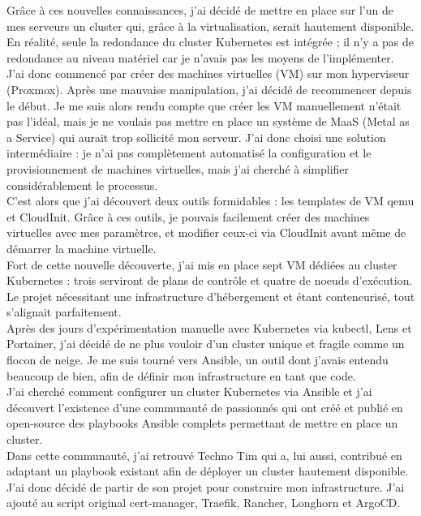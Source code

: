 Grâce à ces nouvelles connaissances, j'ai décidé de mettre en place sur l'un de mes serveurs un cluster qui,
grâce à la virtualisation, serait hautement disponible.
En réalité, seule la redondance du cluster Kubernetes est intégrée ;
il n'y a pas de redondance au niveau matériel car je n'avais pas les moyens de l'implémenter.\\

J'ai donc commencé par créer des machines virtuelles (VM) sur mon hyperviseur (Proxmox).
Après une mauvaise manipulation, j'ai décidé de recommencer depuis le début.
Je me suis alors rendu compte que créer les VM manuellement n'était pas l'idéal,
mais je ne voulais pas mettre en place un système de MaaS (Metal as a Service) qui aurait trop sollicité mon serveur.
J'ai donc choisi une solution intermédiaire : je n'ai pas complètement automatisé la configuration et le provisionnement
de machines virtuelles, mais j'ai cherché à simplifier considérablement le processus.\\

C'est alors que j'ai découvert deux outils formidables : les templates de VM qemu et CloudInit.
Grâce à ces outils, je pouvais facilement créer des machines virtuelles avec mes paramètres,
et modifier ceux-ci via CloudInit avant même de démarrer la machine virtuelle.\\

Fort de cette nouvelle découverte, j'ai mis en place sept VM dédiées au cluster Kubernetes :
trois serviront de plans de contrôle et quatre de noeuds d'exécution.\\

Le projet nécessitant une infrastructure d'hébergement et étant conteneurisé, tout s'alignait parfaitement.\\

Après des jours d'expérimentation manuelle avec Kubernetes via kubectl, Lens et Portainer, j'ai décidé de ne plus vouloir
d'un cluster unique et fragile comme un flocon de neige.
Je me suis tourné vers Ansible, un outil dont j'avais entendu beaucoup de bien, afin de définir mon infrastructure en tant que code.\\

J'ai cherché comment configurer un cluster Kubernetes via Ansible et j'ai découvert l'existence d'une communauté de passionnés
qui ont créé et publié en open-source des playbooks Ansible complets permettant de mettre en place un cluster.\\

Dans cette communauté, j'ai retrouvé Techno Tim qui a, lui aussi, contribué en adaptant un playbook existant
afin de déployer un cluster hautement disponible.
J'ai donc décidé de partir de son projet pour construire mon infrastructure.
J'ai ajouté au script original cert-manager, Traefik, Rancher, Longhorn et ArgoCD\@.\\

